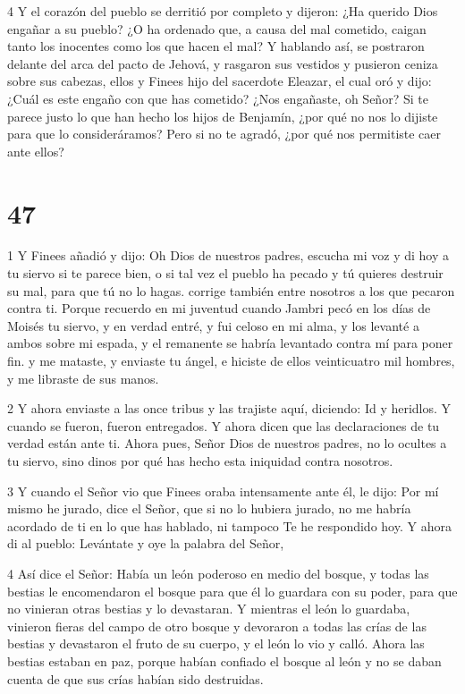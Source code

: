 \par 4 Y el corazón del pueblo se derritió por completo y dijeron: ¿Ha querido Dios engañar a su pueblo? ¿O ha ordenado que, a causa del mal cometido, caigan tanto los inocentes como los que hacen el mal? Y hablando así, se postraron delante del arca del pacto de Jehová, y rasgaron sus vestidos y pusieron ceniza sobre sus cabezas, ellos y Finees hijo del sacerdote Eleazar, el cual oró y dijo: ¿Cuál es este engaño con que has cometido? ¿Nos engañaste, oh Señor? Si te parece justo lo que han hecho los hijos de Benjamín, ¿por qué no nos lo dijiste para que lo consideráramos? Pero si no te agradó, ¿por qué nos permitiste caer ante ellos?



\chapter{47}

\par 1 Y Finees añadió y dijo: Oh Dios de nuestros padres, escucha mi voz y di hoy a tu siervo si te parece bien, o si tal vez el pueblo ha pecado y tú quieres destruir su mal, para que tú no lo hagas. corrige también entre nosotros a los que pecaron contra ti. Porque recuerdo en mi juventud cuando Jambri pecó en los días de Moisés tu siervo, y en verdad entré, y fui celoso en mi alma, y ​​los levanté a ambos sobre mi espada, y el remanente se habría levantado contra mí para poner fin. y me mataste, y enviaste tu ángel, e hiciste de ellos veinticuatro mil hombres, y me libraste de sus manos.

\par 2 Y ahora enviaste a las once tribus y las trajiste aquí, diciendo: Id y heridlos. Y cuando se fueron, fueron entregados. Y ahora dicen que las declaraciones de tu verdad están ante ti. Ahora pues, Señor Dios de nuestros padres, no lo ocultes a tu siervo, sino dinos por qué has hecho esta iniquidad contra nosotros.

\par 3 Y cuando el Señor vio que Finees oraba intensamente ante él, le dijo: Por mí mismo he jurado, dice el Señor, que si no lo hubiera jurado, no me habría acordado de ti en lo que has hablado, ni tampoco Te he respondido hoy. Y ahora di al pueblo: Levántate y oye la palabra del Señor,

\par 4 Así dice el Señor: Había un león poderoso en medio del bosque, y todas las bestias le encomendaron el bosque para que él lo guardara con su poder, para que no vinieran otras bestias y lo devastaran. Y mientras el león lo guardaba, vinieron fieras del campo de otro bosque y devoraron a todas las crías de las bestias y devastaron el fruto de su cuerpo, y el león lo vio y calló. Ahora las bestias estaban en paz, porque habían confiado el bosque al león y no se daban cuenta de que sus crías habían sido destruidas.

